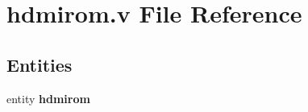 \section{hdmirom.\-v File Reference}
\label{hdmirom_8v}
\subsection*{Entities}
\begin{DoxyCompactItemize}
\item 
entity {\bf hdmirom}
\end{DoxyCompactItemize}
